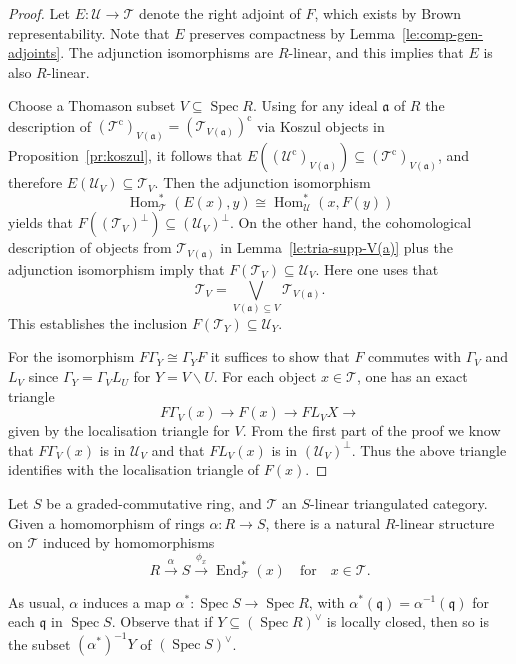 \documentclass{amsart}[a4]
\theoremstyle{definition}
\theoremstyle{remark}
\numberwithin{equation}{section}
\newcommand{\End}{\operatorname{End}}
\newcommand{\Hom}{\operatorname{Hom}}
\newcommand{\Spec}{\operatorname{Spec}}
\newcommand{\lto}{\longrightarrow}
\newcommand{\cat}{\mathcal}
\newcommand{\fa}{\mathfrak{a}}
\newcommand{\fq}{\mathfrak{q}}
\let\Gamma\varGamma
\begin{document}
\begin{proof}
  Let $E\colon\cat U\to\cat T$ denote the right adjoint of $F$, which
  exists by Brown representability. Note that $E$ preserves
  compactness by Lemma~\ref{le:comp-gen-adjoints}.  The adjunction
  isomorphisms are $R$-linear, and this implies that $E$ is also
  $R$-linear.
  
  Choose a Thomason subset $V\subseteq\Spec R$. Using for any ideal
  $\fa$ of $R$ the description of
  $(\cat T^{\mathrm c})_{V(\fa)}=(\cat T_{V(\fa)})^{\mathrm c}$ via
  Koszul objects in Proposition~\ref{pr:koszul}, it follows that
  $E((\cat U^{\mathrm c})_{V(\fa)})\subseteq (\cat T^{\mathrm
    c})_{V(\fa)}$, and therefore $E(\cat U_{V})\subseteq \cat
  T_{V}$. Then the adjunction isomorphism
  \[ \Hom^*_{\cat T}(E(x),y)\cong \Hom^*_{\cat U}(x,F(y))\] yields
  that $F((\cat T_{V})^\perp)\subseteq (\cat U_{V})^\perp$.  On the
  other hand, the cohomological description of objects from
  $\cat T_{V(\fa)}$ in Lemma~\ref{le:tria-supp-V(a)} plus the
  adjunction isomorphism imply that
  $F(\cat T_{V})\subseteq \cat U_{V}$. Here one uses that
  \[\cat T_V=\bigvee_{V(\fa)\subseteq V}\cat T_{V(\fa)}.\] This
  establishes the inclusion $F(\cat T_{Y})\subseteq\cat U_{Y}$.

For the isomorphism $F\Gamma_{Y}\cong\Gamma_{Y}F$ it suffices to show
that $F$ commutes with $\Gamma_V$ and $L_V$ since
$\Gamma_Y=\Gamma_V L_U$ for $Y=V\smallsetminus U$.  For each object $x\in\cat T$, one has an
exact triangle
\[
F\Gamma_{V}(x) \lto F(x) \lto F L_{V}X\lto
\]
given by the localisation triangle for $V$. From the first part of
the proof we know that $F\Gamma_{V}(x)$ is in $\cat U_V$ and that
$F L_{V}(x)$ is in $(\cat U_V)^\perp$. Thus the above triangle
identifies with the localisation triangle of $F(x)$.
\end{proof}

Let $S$ be a graded-commutative  ring, and $\cat T$ an
$S$-linear triangulated category.  Given a homomorphism of rings
$\alpha\colon R\to S$, there is a natural $R$-linear structure on
$\cat T$
induced by homomorphisms
\[
R\xrightarrow{\alpha}
S\xrightarrow{\phi_{x}}\End^{*}_{\cat T}(x)\quad\text{for}\quad x\in
  \cat T.
\]

As usual, $\alpha$ induces a map $\alpha^*\colon \Spec S\to \Spec R$,
with $\alpha^{*}(\fq)=\alpha^{-1}(\fq)$ for each $\fq$ in $\Spec
S$. Observe that if $Y\subseteq(\Spec R)^\vee$ is locally closed,
then so is the subset $(\alpha^*)^{-1}Y$ of $(\Spec S)^\vee$.
\end{document}
